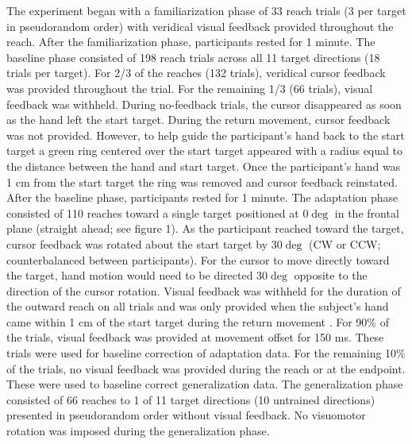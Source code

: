 \documentclass[jou, 11pt, longtable, floatsintext, notab]{apa6}
\begin{document}
The experiment began with a familiarization phase of 33
reach trials (3 per target in pseudorandom order) with
veridical visual feedback provided throughout the reach.
After the familiarization phase, participants rested for 1
minute. The baseline phase consisted of 198 reach trials
across all 11 target directions (18 trials per target). For
2/3 of the reaches (132 trials), veridical cursor feedback
was provided throughout the trial. For the remaining 1/3 (66
trials), visual feedback was withheld. During no-feedback
trials, the cursor disappeared as soon as the hand left the
start target. During the return movement, cursor feedback
was not provided. However, to help guide the participant’s
hand back to the start target a green ring centered over the
start target appeared with a radius equal to the distance
between the hand and start target. Once the participant’s
hand was 1 cm from the start target the ring was removed and
cursor feedback reinstated. After the baseline phase,
participants rested for 1 minute. The adaptation phase
consisted of 110 reaches toward a single target positioned
at $0\deg$ in the frontal plane (straight ahead; see figure
1). As the participant reached toward the target, cursor
feedback was rotated about the start target by $30\deg$ (CW
or CCW; counterbalanced between participants). For the
cursor to move directly toward the target, hand motion would
need to be directed $30\deg$ opposite to the direction of
the cursor rotation. Visual feedback was withheld for the
duration of the outward reach on all trials and was only
provided when the subject’s hand came within 1 cm of the
start target during the return movement
\cite{brayanov_motor_2012}. For 90\% of the trials, visual
feedback was provided at movement offset for 150 ms. These
trials were used for baseline correction of adaptation data.
For the remaining 10\% of the trials, no visual feedback was
provided during the reach or at the endpoint. These were
used to baseline correct generalization data. The
generalization phase consisted of 66 reaches to 1 of 11
target directions (10 untrained directions) presented in
pseudorandom order without visual feedback. No visuomotor
rotation was imposed during the generalization phase.
\end{document}
